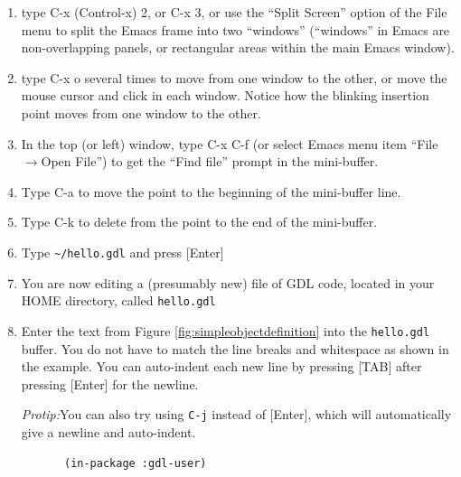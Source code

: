 \documentclass [11pt]{book}
\begin{document}
\label{subsec:developingandtestingahelloworldapplication}

 

\begin{enumerate}

\item type C-x (Control-x) 2, or C-x 3, or use the ``Split
Screen'' option of the File menu to split the Emacs frame into two
``windows'' (``windows'' in Emacs are non-overlapping panels, or
rectangular areas within the main Emacs window).

\item type C-x o several times to move from one window to
the other, or move the mouse cursor and click in each window. Notice
how the blinking insertion point moves from one window to the other.

\item In the top (or left) window, type C-x C-f (or select Emacs menu item
``File$\rightarrow$Open File'') to get the ``Find file'' prompt in the
mini-buffer.

\item Type C-a to move the point to the beginning of the mini-buffer line.

\item Type C-k to delete from the point to the end of the mini-buffer.

\item Type \texttt{\textasciitilde/hello.gdl} and press [Enter]

\item You are now editing a (presumably new) file of GDL
	 code, located in your HOME directory, called \texttt{hello.gdl}

\item Enter the text from Figure 
\ref{fig:simpleobjectdefinition} into the \texttt{hello.gdl} buffer. You do not have to match the line breaks and whitespace as shown in the example.
You can auto-indent each new line by pressing [TAB] after pressing [Enter] for the newline.

\emph{Protip:}You can also try using \texttt{C-j} instead of [Enter], which will automatically give a newline and auto-indent.



\begin{figure}
\begin{lrbox}{\boxedverb}
\begin{minipage}{\linewidth}

\begin{verbatim}
 (in-package :gdl-user)


\end{verbatim}
\end{minipage}
\end{lrbox}
\end{figure}
\end{enumerate}
\end{document}
